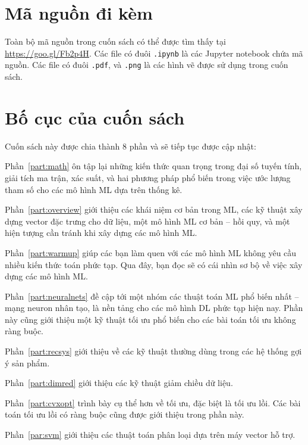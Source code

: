 \section{Mã nguồn đi kèm}
Toàn bộ mã nguồn trong cuốn sách có thể được tìm thấy tại
\url{https://goo.gl/Fb2p4H}. Các file có đuôi \texttt{.ipynb} là các
Jupyter notebook chứa mã nguồn. Các file có đuôi \texttt{.pdf}, và \texttt{.png}
là các hình vẽ được sử dụng trong cuốn sách.

\section{Bố cục của cuốn sách}
Cuốn sách này được chia thành 8 phần và sẽ tiếp tục được cập nhật:

{Phần~\ref{part:math}} ôn tập lại những kiến thức quan trọng trong đại số tuyến
tính, giải tích ma trận, xác suất, và hai phương pháp phổ biến trong việc ước
lượng tham số cho các mô hình ML dựa trên thống kê.

Phần~\ref{part:overview} giới thiệu các khái niệm cơ bản trong ML, các kỹ thuật
xây dựng vector đặc trưng cho dữ liệu, một mô hình ML cơ bản -- hồi quy, và một hiện tượng cần tránh khi xây dựng các mô hình ML.

Phần~\ref{part:warmup} giúp các bạn làm quen với các mô hình ML không yêu cầu
nhiều kiến thức toán phức tạp. Qua đây, bạn đọc sẽ có cái nhìn sơ bộ về việc xây
dựng các mô hình ML.


Phần~\ref{part:neuralnets} đề cập tới một nhóm các thuật toán ML phổ biến nhất
-- mạng neuron nhân tạo, là nền tảng cho các mô hình DL phức tạp
hiện nay. Phần này cũng giới thiệu một kỹ thuật tối ưu phổ biến cho các bài toán
tối ưu không ràng buộc.

Phần~\ref{part:recsys} giới thiệu về các kỹ thuật thường dùng trong các hệ thống
gợi ý sản phẩm.

Phần~\ref{part:dimred} giới thiệu các kỹ thuật giảm chiều dữ liệu.

Phần~\ref{part:cvxopt} trình bày cụ thể hơn về tối ưu, đặc biệt là tối ưu lồi.
Các bài toán tối ưu lồi có ràng buộc cũng được giới thiệu trong phần này.

Phần~\ref{par:svm} giới thiệu các thuật toán phân loại dựa trên máy vector hỗ trợ.


